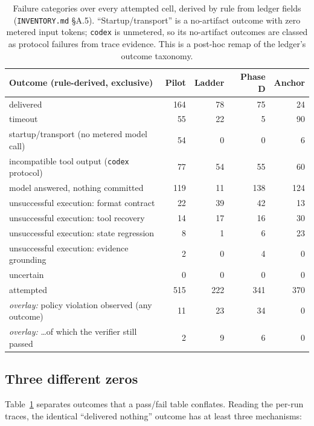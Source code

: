 \documentclass[10pt]{article}
\begin{document}
\begin{table}[t]
\centering\small
\begin{tabular}{lrrrr}
\toprule
Outcome (rule-derived, exclusive) & Pilot & Ladder & Phase D & Anchor\\
\midrule
delivered & 164 & 78 & 75 & 24\\
timeout & 55 & 22 & 5 & 90\\
startup/transport (no metered model call) & 54 & 0 & 0 & 6\\
incompatible tool output (\texttt{codex} protocol) & 77 & 54 & 55 & 60\\
model answered, nothing committed & 119 & 11 & 138 & 124\\
unsuccessful execution: format contract & 22 & 39 & 42 & 13\\
unsuccessful execution: tool recovery & 14 & 17 & 16 & 30\\
unsuccessful execution: state regression & 8 & 1 & 6 & 23\\
unsuccessful execution: evidence grounding & 2 & 0 & 4 & 0\\
uncertain & 0 & 0 & 0 & 0\\
\midrule
attempted & 515 & 222 & 341 & 370\\
\emph{overlay:} policy violation observed (any outcome) & 11 & 23 & 34 & 0\\
\emph{overlay:} \ldots of which the verifier still passed & 2 & 9 & 6 & 0\\
\bottomrule
\end{tabular}
\caption{Failure categories over every attempted cell, derived by rule from ledger fields
(\texttt{INVENTORY.md} \S A.5). ``Startup/transport'' is a no-artifact outcome with zero metered
input tokens; \texttt{codex} is unmetered, so its no-artifact outcomes are classed as protocol
failures from trace evidence. This is a post-hoc remap of the ledger's outcome taxonomy.}
\label{tab:failures}
\end{table}

\subsection{Three different zeros}
\label{sec:zeros}

Table~\ref{tab:failures} separates outcomes that a pass/fail table conflates. Reading the per-run
traces, the identical ``delivered nothing'' outcome has at least three mechanisms:
\end{document}
